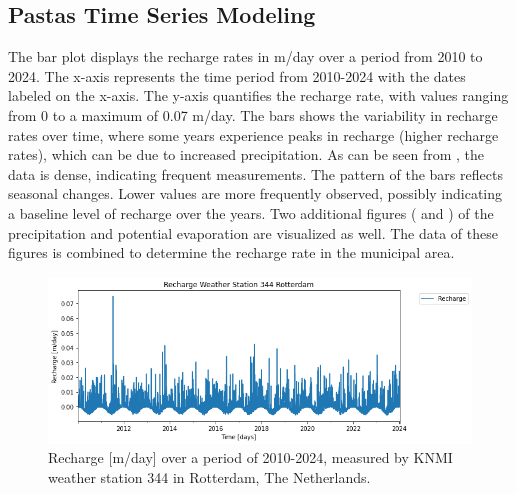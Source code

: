 \subsection{Pastas Time Series Modeling}
The bar plot displays the recharge rates in m/day over a period from 2010 to 2024. The x-axis represents the time period from 2010-2024 with the dates labeled on the x-axis. The y-axis quantifies the recharge rate, with values ranging from 0 to a maximum of 0.07 m/day. The bars shows the variability in recharge rates over time, where some years experience peaks in recharge (higher recharge rates), which can be due to increased precipitation. As can be seen from , the data is dense, indicating frequent measurements. The pattern of the bars reflects seasonal changes. Lower values are more frequently observed, possibly indicating a baseline level of recharge over the years. Two additional figures ( and ) of the precipitation and potential evaporation are visualized as well. The data of these figures is combined to determine the recharge rate in the municipal area.


\begin{figure}[htbp]
    \centering
    \includegraphics[width=0.80\linewidth]{frontmatter/Rozenburg-fig/Recharge.png}
    \caption{Recharge [m/day] over a period of 2010-2024, measured by KNMI weather station 344 in Rotterdam, The Netherlands.}
    \label{recharge}
\end{figure}

